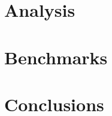 \documentclass[acmsmall,authordraft]{acmart}
\begin{document}
    \section{Analysis}
    \label{sec:analysis}
    

    \section{Benchmarks}
    \label{sec:benchmarks}
    

    \section{Conclusions}
    \label{sec:conclusions}
    

    
    
\end{document}
